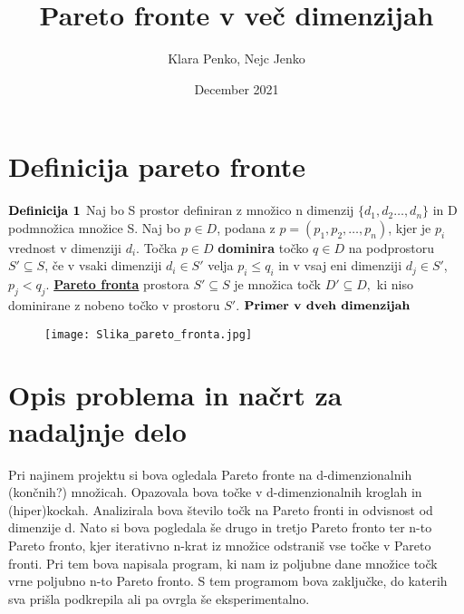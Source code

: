 \documentclass{article}
\title{Pareto fronte v več dimenzijah}
\author{Klara Penko, Nejc Jenko}
\date{December 2021}
\begin{document}
\begin{titlepage}
    \maketitle
\end{titlepage}

\section{Definicija pareto fronte}
${\rm \textbf{Definicija 1}}$ Naj bo S prostor definiran z množico n dimenzij $\{d_{1},d_{2}\dots,d_{n}\}$ in D podmnožica množice S. Naj bo $p \in D$, podana z $p = (p_{1},p_{2},\dots,p_{n})$, kjer je $p_{i}$ vrednost v dimenziji $d_{i}$. Točka $p \in D$ \textbf{dominira} točko $q \in D$ na podprostoru $S'\subseteq S$, če v vsaki dimenziji $d_{i} \in S'$ velja $p_{i} \le q_{i}$ in v vsaj eni dimenziji $d_{j} \in S'$, $p_{j} < q_{j}$. 
\underline{\textbf{Pareto fronta}} prostora $S' \subseteq S$ je množica točk $D' \subseteq D,$ ki niso dominirane z nobeno točko v prostoru $S'$. \break
\break
${\rm \textbf{Primer v dveh dimenzijah}}$

 \begin{figure}[htbp]
\texttt{[image: Slika\_pareto\_fronta.jpg]}
\centering
\end{figure}

\section{Opis problema in načrt za nadaljnje delo}

Pri najinem projektu si bova ogledala Pareto fronte na d-dimenzionalnih (končnih?) množicah. Opazovala bova točke v d-dimenzionalnih kroglah in (hiper)kockah. Analizirala bova število točk na Pareto fronti in odvisnost od dimenzije d. Nato si bova pogledala še drugo in tretjo Pareto fronto ter n-to Pareto fronto, kjer iterativno n-krat iz množice odstraniš vse točke v Pareto fronti. Pri tem bova napisala program, ki nam iz poljubne dane množice točk vrne poljubno n-to Pareto fronto. S tem programom bova zaključke, do katerih sva prišla podkrepila ali pa ovrgla še eksperimentalno.
\end{document}
